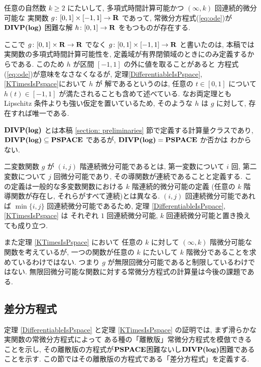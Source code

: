  \begin{theorem}
  \label{KTimesIsPspace}
  任意の自然数 $k \ge 2$ にたいして, 
  多項式時間計算可能かつ $(\infty, k)$ 回連続的微分可能な
  実関数 $g \colon [0,1] \times [-1,1] \to \mathbf R$ であって, 
  常微分方程式(\ref{eq:ode})が
  $\text{\bf DIVP(log)}$ 困難な解 $h \colon [0, 1] \to \mathbf R$ をもつものが存在する.
 \end{theorem}

ここで $g \colon [0,1] \times \mathbf R \to \mathbf R$ でなく
$g \colon [0,1] \times [-1, 1] \to \mathbf R$ と書いたのは, 
本稿では実関数の多項式時間計算可能性を, 
定義域が有界閉領域のときにのみ定義するからである. 
このため $h$ が区間 $[-1, 1]$ の外に値を取ることがあると
方程式(\ref{eq:ode})が意味をなさなくなるが, 
定理\ref{DifferentiableIsPspace}, \ref{KTimesIsPspace}において $h$ が
解であるというのは, 
任意の $t \in [0, 1]$ について $h (t) \in [-1, 1]$ が満たされることも含めて述べている.
なお両定理とも Lipschitz 条件よりも強い仮定を置いているため, 
そのような $h$ は $g$ に対して, 存在すれば唯一である. 

 $\text{\bf DIVP(log)}$ とは本稿 \ref{section: preliminaries} 節で定義する計算量クラスであり,
 $\text{\bf DIVP(log)} \subseteq {\bf PSPACE}$ であるが, $\text{\bf DIVP(log)} = {\bf PSPACE}$ か否かは
 わからない. 

 二変数関数 $g$ が $(i, j)$ 階連続微分可能であるとは,
 第一変数について $i$ 回, 第二変数について $j$ 回微分可能であり,
 その導関数が連続であることと定義する.
 この定義は一般的な多変数関数における $k$ 階連続的微分可能の定義
 (任意の $k$ 階導関数が存在し, それらがすべて連続)とは異なる.
 $(i,j)$ 回連続微分可能であれば $\min \{i, j\}$ 回連続微分可能であるため,
 定理 \ref{DifferentiableIsPspace}, \ref{KTimesIsPspace} は
 それぞれ $1$ 回連続微分可能, $k$ 回連続微分可能と置き換えても成り立つ.

 また定理 \ref{KTimesIsPspace} において
 任意の $k$ に対して $(\infty, k)$ 階微分可能な関数を考えているが,
 一つの関数が任意の $k$ にたいして $k$ 階微分であることを求めているわけではない.
 つまり $g$ が無限回微分可能であると制限しているわけではない. 
 無限回微分可能な関数に対する常微分方程式の計算量は今後の課題である.





\subsection{差分方程式}
\label{section:divp}

定理 \ref{DifferentiableIsPspace} と定理 \ref{KTimesIsPspace} の証明では,
まず滑らかな実関数の常微分方程式によって
ある種の「離散版」常微分方程式を模倣できることを示し, 
その離散版の方程式が${\bf PSPACE}$困難ないし$\text{\bf DIVP(log)}$困難であることを示す.
この節ではその離散版の方程式である「差分方程式」を定義する.

